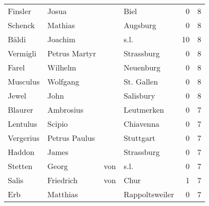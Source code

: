 \documentclass[10pt,a4paper,landscape]{article}
\begin{document}
\begin{longtable}{llllrr}
                  Finsler &                              Josua &             &                                        Biel &          0 &         8 \\
                  Schenck &                            Mathias &             &                                    Augsburg &          0 &         8 \\
                    Bäldi &                            Joachim &             &                                        s.l. &         10 &         8 \\
                 Vermigli &                      Petrus Martyr &             &                                  Strassburg &          0 &         8 \\
                    Farel &                            Wilhelm &             &                                   Neuenburg &          0 &         8 \\
                 Musculus &                           Wolfgang &             &                                  St. Gallen &          0 &         8 \\
                    Jewel &                               John &             &                                   Salisbury &          0 &         8 \\
                  Blaurer &                          Ambrosius &             &                                  Leutmerken &          0 &         7 \\
                 Lentulus &                             Scipio &             &                                   Chiavenna &          0 &         7 \\
                Vergerius &                      Petrus Paulus &             &                                   Stuttgart &          0 &         7 \\
                   Haddon &                              James &             &                                  Strassburg &          0 &         7 \\
                  Stetten &                              Georg &         von &                                        s.l. &          0 &         7 \\
                    Salis &                          Friedrich &         von &                                        Chur &          1 &         7 \\
                      Erb &                           Matthias &             &                              Rappoltsweiler &          0 &         7 \\

\end{longtable}
\end{document}
